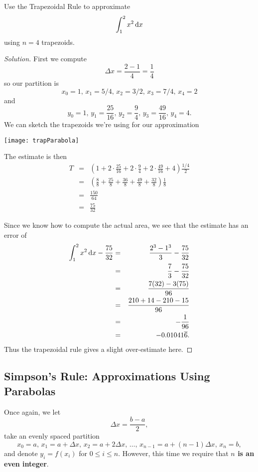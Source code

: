 \documentclass[reqno, 12pt]{amsart}
\begin{document}
\begin{example}
  Use the Trapezoidal Rule to approximate
  \[\int_1^2 x^2 \dif x\]
  using \(n = 4\) trapezoids.
\end{example}
\begin{proof}[Solution]
  First we compute
  \[\Delta x = \frac{2 - 1}{4} = \frac{1}{4}\]
  so our partition is
  \[x_0 = 1,\, x_1 = 5/4,\, x_2 = 3/2,\, x_3 = 7/4,\, x_4 = 2\]
  and
  \[y_0 = 1,\, y_1 = \frac{25}{16},\, y_2 = \frac{9}{4},\, y_3 = \frac{49}{16},\, y_4 = 4.\]
  We can sketch the trapezoids we're using for our approximation
  \begin{center}
    \texttt{[image: trapParabola]}
  \end{center}
  The estimate is then
  \begin{eqnarray*}
    T &=& \left(1 + 2\cdot\frac{25}{16} + 2\cdot\frac{9}{4} + 2\cdot\frac{49}{16} + 4\right)\frac{1/4}{2}\\
    &=& \left(\frac{8}{8} + \frac{25}{8} + \frac{36}{8} + \frac{49}{8} + \frac{32}{8}\right)\frac{1}{8}\\
    &=& \frac{150}{64}\\
    &=& \frac{75}{32}
  \end{eqnarray*}

  Since we know how to compute the actual area, we see that the estimate has an error of
  \begin{eqnarray*}
    \int_1^2 x^2 \dif x - \frac{75}{32} &=& \frac{2^3 - 1^3}{3} - \frac{75}{32}\\
    &=& \frac{7}{3} - \frac{75}{32}\\
    &=& \frac{7(32) - 3(75)}{96}\\
    &=& \frac{210 + 14 - 210 - 15}{96}\\
    &=& -\frac{1}{96}\\
    &=& -0.01041\overline{6}.
  \end{eqnarray*}
  Thus the trapezoidal rule gives a slight over-estimate here.
\end{proof}

\subsection{Simpson's Rule: Approximations Using Parabolas}

Once again, we let
\[\Delta x = \frac{b - a}{2},\]
take an evenly spaced partition
\[x_0 = a,\, x_1 = a + \Delta x,\, x_2 = a + 2\Delta x,\, \ldots,\, x_{n-1} = a + (n-1)\Delta x,\, x_n = b,\]
and denote \(y_i = f(x_i)\) for \(0 \leq i \leq n\).
However, this time we require that \textbf{\(n\) is an even integer}.
\end{document}
